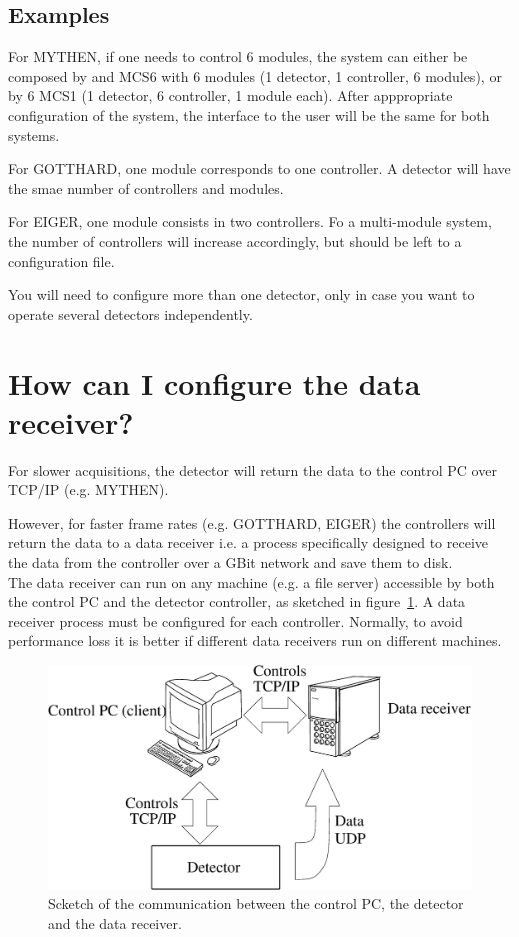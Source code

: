\subsection{Examples}

For MYTHEN, if one needs to control 6 modules, the system can either be composed by and MCS6 with 6 modules (1 detector, 1 controller, 6 modules), or by 6 MCS1 (1 detector, 6 controller, 1 module each). After apppropriate configuration of the system, the interface to the user will be the same for both systems.

For GOTTHARD, one module corresponds to one controller. A detector will have the smae number of controllers and modules.

For EIGER, one module consists in two controllers. Fo a multi-module system, the number of controllers will increase accordingly, but should be left to a configuration file.

You will need to configure more than one detector, only in case you want to operate several detectors independently.


\section{How can I configure the data receiver?}

For slower acquisitions, the detector will return the data to the control PC over TCP/IP (e.g. MYTHEN).

However, for faster frame rates (e.g. GOTTHARD, EIGER) the controllers will return the data to a data receiver i.e. a process specifically designed to receive the data from the controller over a GBit network and save them to disk. \\
The data receiver can run on any machine (e.g. a file server) accessible by both the control PC and the detector controller, as sketched in figure~\ref{fig:datareceiver}. A data receiver process must be configured for each controller. Normally, to avoid performance loss it is better if different data receivers run on different machines.

\begin{figure}
\caption{Scketch of the communication between the control PC, the detector and the data receiver.}\label{fig:datareceiver}
\includegraphics[width=\textwidth]{data_receiver}
\end{figure} 


